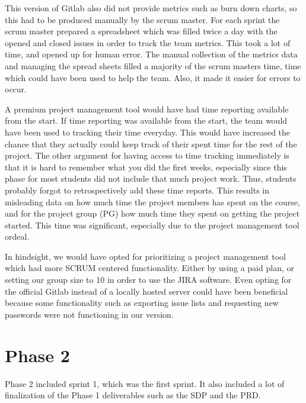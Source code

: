 \documentclass{article}
\begin{document}
This version of Gitlab also did not provide metrics such as burn down charts, so this had to be produced manually by the scrum master. For each sprint the scrum master prepared a spreadsheet which was filled twice a day with the opened and closed issues in order to track the team metrics. This took a lot of time, and opened up for human error. The manual collection of the metrics data and managing the spread sheets filled a majority of the scrum masters time, time which could have been used to help the team. Also, it made it easier for errors to occur.

A premium project management tool would have had time reporting available from the start. If time reporting was available from the start, the team would have been used to tracking their time everyday. This would have increased the chance that they actually could keep track of their spent time for the rest of the project. The other argument for having access to time tracking immediately is that it is hard to remember what you did the first weeks, especially since this phase for most students did not include that much project work. Thus, students probably forgot to retrospectively add these time reports. This results in misleading data on how much time the project members has spent on the course, and for the project group (PG) how much time they spent on getting the project started. This time was significant, especially due to the project management tool ordeal.  

In hindsight, we would have opted for prioritizing a project management tool which had more SCRUM centered functionality. Either by using a paid plan, or setting our group size to 10 in order to use the JIRA software. Even opting for the official Gitlab instead of a locally hosted server could have been beneficial because some functionality such as exporting issue lists and requesting new passwords were not functioning in our version.

\section{Phase 2} %
Phase 2 included sprint 1, which was the first sprint. It also included a lot of finalization of the Phase 1 deliverables such as the SDP\cite{SDP} and the PRD\cite{PRD}.
\end{document}
